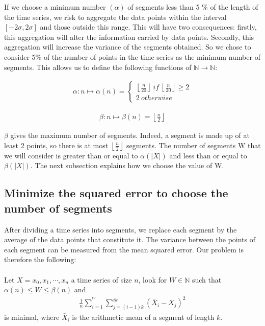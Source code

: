 If we choose a minimum number $ (\alpha) $ of segments less than 5 \% of the length of the time series, we risk to aggregate the data points within the interval $ [- 2 \sigma, 2 \sigma] $ and those outside this range. This will have two consequences: firstly, this aggregation will alter the information carried by data points. Secondly, this aggregation will increase the variance of the segments obtained. So we chose to  consider 5\% of the number of points in the time series as the minimum number of segments. This allows us to define the following functions of $ \mathbb{N} \rightarrow \mathbb{N} $:

\begin{eqnarray}
\alpha: n \mapsto \alpha(n) = \left \{
\begin{array}{c}
\left \lfloor \frac{n}{20} \right \rfloor \: if \: \left \lfloor \frac{n}{20} \right \rfloor \geq 2 \\
2 \: otherwise
\end{array} 
\right.
\end{eqnarray}



\begin{eqnarray}
\beta: n \mapsto \beta(n) = \left \lfloor \frac{n}{2} \right \rfloor
\end{eqnarray}

 $ \beta $ gives the maximum number of segments. Indeed, a segment is made up of at least 2 points, so there is at most $ \left \lfloor
\frac{n}{2} \right \rfloor $ segments. The number of segments W that we will consider is greater than or equal to $ \alpha (| X |) $ and less than or equal to $ \beta (| X |) $. The next subsection explains how we choose the value of W.

\subsection{Minimize the squared error to choose the number of segments}
After dividing a time series into segments, we replace each segment by the average of the data points that constitute it. The variance between the points of each segment can be measured from the mean squared error. Our problem is therefore the following:
\paragraph{} Let $ X = x_{0}, x_{1}, \cdots, x_{n} $ a time series of size $ n $, look for $ W \in \mathbb{N} $ such that $ \alpha(n) \leq W \leq \beta(n) $ and 
\begin{eqnarray}
 \frac{1}{n} \sum_{i = 1}^{^{W}} \sum_{j = (i-1) k}^{ik} (\bar{X}_{i} - X_{j})^{2} 
\end{eqnarray}
 is minimal, where $ \bar{X}_{i} $ is the arithmetic mean of a segment of length $ k $. 





